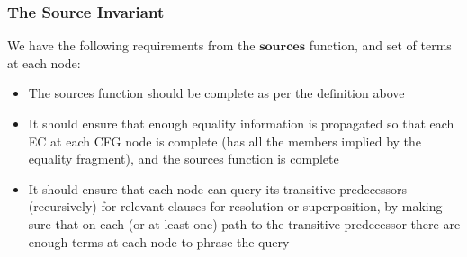 \subsubsection{The Source Invariant}
We have the following requirements from the $\mathbf{sources}$ function, and set of terms at each node:
\begin{itemize}
	\item The sources function should be complete as per the definition above
	\item It should ensure that enough equality information is propagated so that each EC at each CFG node is complete (has all the members implied by the equality fragment), and the sources function is complete
	\item It should ensure that each node can query its transitive predecessors (recursively) for relevant clauses for resolution or superposition, by making sure that on each (or at least one) path to the transitive predecessor there are enough terms at each node to phrase the query
\end{itemize}


